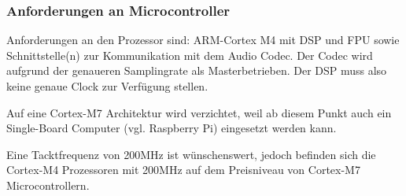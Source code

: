 \subsubsection{Anforderungen an Microcontroller}
\label{sec:Konzept_Microcontroller}

Anforderungen an den Prozessor sind: ARM-Cortex M4 mit DSP und FPU sowie Schnittstelle(n) zur Kommunikation mit dem Audio Codec. Der Codec wird aufgrund der genaueren Samplingrate als Masterbetrieben. Der DSP muss also keine genaue Clock zur Verfügung stellen. 

Auf eine Cortex-M7 Architektur wird verzichtet, weil ab diesem Punkt auch ein Single-Board Computer (vgl. Raspberry Pi) eingesetzt werden kann.

Eine Tacktfrequenz von 200MHz ist wünschenswert, jedoch befinden sich die Cortex-M4 Prozessoren mit 200MHz auf dem Preisniveau von Cortex-M7 Microcontrollern.


